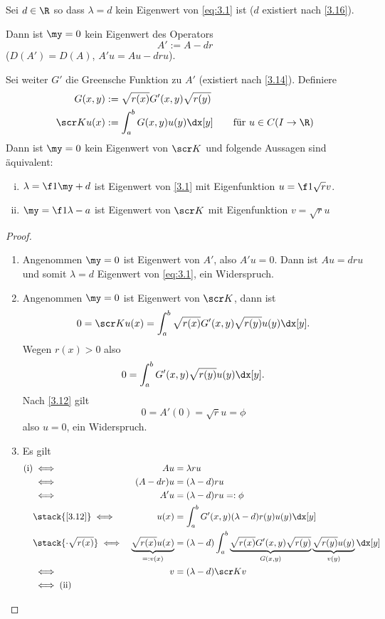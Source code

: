 \begin{st} \label{3.17}
	Sei $d\in \R$ so dass $\lambda = d$ kein Eigenwert von \eqref{eq:3.1} ist ($d$ existiert nach \ref{3.16}).

	Dann ist $\my = 0$ kein Eigenwert des Operators
	\[
		A' := A - dr
	\]
	($D(A') = D(A)$, $A'u = Au - dru$).

	Sei weiter $G'$ die Greensche Funktion zu $A'$ (existiert nach \ref{3.14}).
	Definiere
	\begin{align*}
		G(x,y) &:= \sqrt {r(x)} G'(x,y) \sqrt{r(y)} \\
		\scr K u(x) &:= \int_a^b G(x,y) u(y) \dx[y]  \qquad \text{für $u\in C(I\to \R)$}
	\end{align*}
	Dann ist $\my = 0$ kein Eigenwert von $\scr K$ und folgende Aussagen sind äquivalent:
	\begin{enumerate}[(i)]
		\item
			$\lambda = \f 1\my + d$ ist Eigenwert von \ref{3.1} mit Eigenfunktion $u=\f 1{\sqrt r} v$.
		\item
			$\my = \f 1{\lambda -a}$ ist Eigenwert von $\scr K$ mit Eigenfunktion $v = \sqrt{r} u$
	\end{enumerate}
	\begin{proof}
		\begin{enumerate}[1)]
			\item
				Angenommen $\my = 0$ ist Eigenwert von $A'$, also $A'u = 0$.
				Dann ist $Au = dru$ und somit $\lambda = d$ Eigenwert von \eqref{eq:3.1}, ein Widerspruch.
			\item
				Angenommen $\my = 0$ ist Eigenwert von $\scr K$, dann ist
				\begin{align*}
					0 = \scr K u(x) = \int_a^b \sqrt{r(x)} G'(x,y) \sqrt{r(y)} u(y) \dx[y].
				\end{align*}
				Wegen $r(x) > 0$ also
				\begin{align*}
					0 = \int_a^b G'(x,y) \sqrt{r(y)} u(y) \dx[y].
				\end{align*}
				Nach \ref{3.12} gilt 
				\[
					0 = A'(0) = \sqrt{r} u = \phi
				\]
				also $u = 0$, ein Widerspruch.
			\item
				Es gilt
				\begin{alignat*}{2}
					\text{(i)} &\iff& Au &= \lambda ru \\
					&\iff& (A-dr)u &= (\lambda - d)ru \\
					&\iff& A' u &= (\lambda -d)ru =: \phi \\
					&\stack{\ref{3.12}}\iff& u(x) &= \int_a^b G'(x,y) (\lambda -d) r(y) u(y) \dx[y] \\
					&\stack{\cdot \sqrt{r(x)}}\iff& \underbrace{\sqrt{r(x)} u(x)}_{=:v(x)} &= (\lambda - d) \int_a^b \underbrace{\sqrt{r(x)} G'(x,y) \sqrt{r(y)}}_{G(x,y)} \underbrace{\sqrt{r(y)} u(y)}_{v(y)} \dx[y] \\
					&\iff& v &= (\lambda -d) \scr K v \\
					&\iff \text{(ii)}&&
				\end{alignat*}
		\end{enumerate}
	\end{proof}
\end{st}

